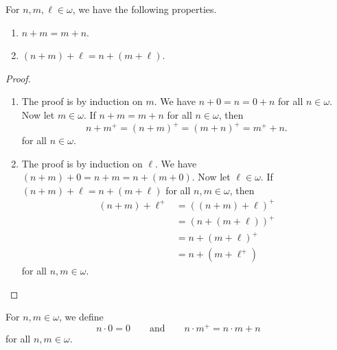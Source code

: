 \begin{theorem}
  For $n, m, \ell \in \omega$, we have the following properties.
  \begin{enumerate}
    \item $n + m = m + n$.
    \item $(n + m) + \ell = n + (m + \ell)$.
  \end{enumerate}
\end{theorem}
\begin{proof}
  \leavevmode
  \begin{enumerate}
    \item The proof is by induction on $m$.
    We have $n + 0 = n = 0 + n$ for all $n \in \omega$.
    Now let $m \in \omega$.
    If $n + m = m + n$ for all $n \in \omega$, then
    \begin{equation*}
      n + m^+ = (n + m)^+ = (m + n)^+ = m^+ + n.
    \end{equation*}
    for all $n \in \omega$.
    \item The proof is by induction on $\ell$.
    We have $(n + m) + 0 = n + m = n + (m + 0)$.
    Now let $\ell \in \omega$.
    If $(n + m) + \ell = n + (m + \ell)$ for all $n, m \in \omega$, then
    \begin{align*}
      (n + m) + \ell^+
      &= ((n + m) + \ell)^+ \\
      &= (n + (m + \ell))^+ \\
      &= n + (m + \ell)^+ \\
      &= n + (m + \ell^+)
    \end{align*}
    for all $n, m \in \omega$.
  \end{enumerate}
\end{proof}

\begin{definition}
  For $n, m \in \omega$, we define
  \begin{equation*}
    n \cdot 0 = 0
    \qquad \text{and} \qquad
    n \cdot m^+ = n \cdot m + n
  \end{equation*}
  for all $n, m \in \omega$.
\end{definition}

